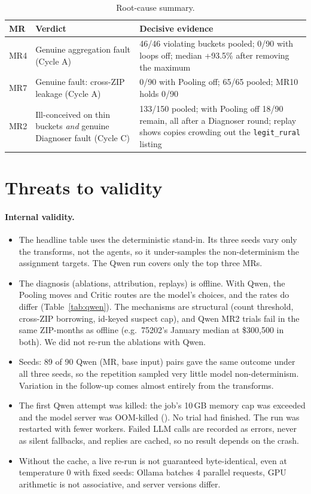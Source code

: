\documentclass[11pt,a4paper]{article}
\newcommand{\file}[1]{\texttt{\detokenize{#1}}}
\begin{document}
\begin{table}[h]
\centering\small
\begin{tabularx}{\textwidth}{@{}lL{3.4cm}X@{}}
\toprule
MR & Verdict & Decisive evidence \\
\midrule
MR4 & Genuine aggregation fault (Cycle A) & 46/46 violating buckets pooled; 0/90 with loops off; median +93.5\% after removing the maximum \\
MR7 & Genuine fault: cross-ZIP leakage (Cycle A) & 0/90 with Pooling off; 65/65 pooled; MR10 holds 0/90 \\
MR2 & Ill-conceived on thin buckets \emph{and} genuine Diagnoser fault (Cycle C) & 133/150 pooled; with Pooling off 18/90 remain, all after a Diagnoser round; replay shows copies crowding out the \texttt{legit\_rural} listing \\
\bottomrule
\end{tabularx}
\caption{Root-cause summary.}
\end{table}

\section{Threats to validity}\label{sec:threats}
\paragraph{Internal validity.}
\begin{itemize}
  \item The headline table uses the deterministic stand-in. Its three seeds vary only the transforms, not the agents,
  so it under-samples the non-determinism the assignment targets. The Qwen run covers only the top three MRs.
  \item The diagnosis (ablations, attribution, replays) is offline. With Qwen, the Pooling moves and Critic routes are
  the model's choices, and the rates do differ (Table~\ref{tab:qwen}). The mechanisms are structural (count
  threshold, cross-ZIP borrowing, id-keyed suspect cap), and Qwen MR2 trials fail in the same ZIP-months as offline
  (e.g.\ 75202's January median at \$300,500 in both). We did not re-run the ablations with Qwen.
  \item Seeds: 89 of 90 Qwen (MR, base input) pairs gave the same outcome under all three seeds, so the repetition
  sampled very little model non-determinism. Variation in the follow-up comes almost entirely from the transforms.
  \item The first Qwen attempt was killed: the job's 10\,GB memory cap was exceeded and the model server was
  OOM-killed (\file{results/mr_llm_run_oom_attempt.log}). No trial had finished. The run was restarted with fewer
  workers. Failed LLM calls are recorded as errors, never as silent fallbacks, and replies are cached, so no result
  depends on the crash.
  \item Without the cache, a live re-run is not guaranteed byte-identical, even at temperature 0 with fixed seeds:
  Ollama batches 4 parallel requests, GPU arithmetic is not associative, and server versions differ.
\end{itemize}
\end{document}
